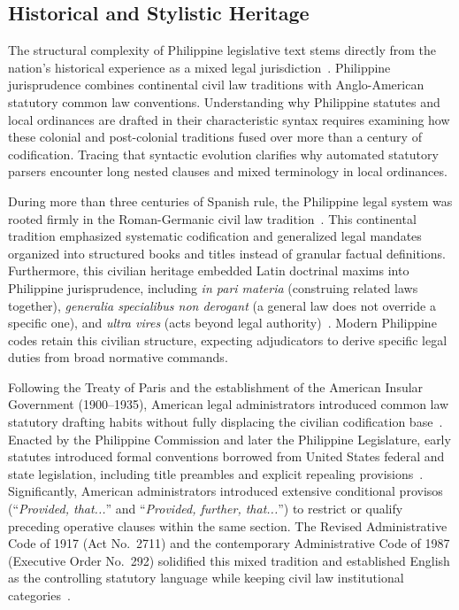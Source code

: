     \subsection{Historical and Stylistic Heritage}
    The structural complexity of Philippine legislative text stems directly from the nation's historical experience as a mixed legal jurisdiction~\cite{agpalo2009statutory, cruz2007political}. Philippine jurisprudence combines continental civil law traditions with Anglo-American statutory common law conventions. Understanding why Philippine statutes and local ordinances are drafted in their characteristic syntax requires examining how these colonial and post-colonial traditions fused over more than a century of codification. Tracing that syntactic evolution clarifies why automated statutory parsers encounter long nested clauses and mixed terminology in local ordinances.

    During more than three centuries of Spanish rule, the Philippine legal system was rooted firmly in the Roman-Germanic civil law tradition~\cite{agpalo2009statutory}. This continental tradition emphasized systematic codification and generalized legal mandates organized into structured books and titles instead of granular factual definitions. Furthermore, this civilian heritage embedded Latin doctrinal maxims into Philippine jurisprudence, including \textit{in pari materia} (construing related laws together), \textit{generalia specialibus non derogant} (a general law does not override a specific one), and \textit{ultra vires} (acts beyond legal authority)~\cite{agpalo2009statutory}. Modern Philippine codes retain this civilian structure, expecting adjudicators to derive specific legal duties from broad normative commands.

    Following the Treaty of Paris and the establishment of the American Insular Government (1900--1935), American legal administrators introduced common law statutory drafting habits without fully displacing the civilian codification base~\cite{cruz2007political}. Enacted by the Philippine Commission and later the Philippine Legislature, early statutes introduced formal conventions borrowed from United States federal and state legislation, including title preambles and explicit repealing provisions~\cite{agpalo2009statutory}. Significantly, American administrators introduced extensive conditional provisos (``\textit{Provided, that...}'' and ``\textit{Provided, further, that...}'') to restrict or qualify preceding operative clauses within the same section. The Revised Administrative Code of 1917 (Act No.~2711) and the contemporary Administrative Code of 1987 (Executive Order No.~292) solidified this mixed tradition and established English as the controlling statutory language while keeping civil law institutional categories~\cite{philgov1987eo292}.

